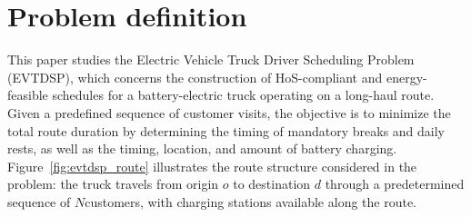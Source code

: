 \documentclass[3p,11pt,authoryear]{elsarticle}  %
\begin{document}
    \section{Problem definition}
    
    
    
This paper studies the Electric Vehicle Truck Driver Scheduling Problem (EVTDSP), which concerns the construction of HoS-compliant and energy-feasible schedules for a battery-electric truck operating on a long-haul route. Given a predefined sequence of customer visits, the objective is to minimize the total route duration by determining the timing of mandatory breaks and daily rests, as well as the timing, location, and amount of battery charging. Figure~\ref{fig:evtdsp_route} illustrates the route structure considered in the problem: the truck travels from origin $o$ to destination $d$ through a predetermined sequence of $N$customers, with charging stations available along the route.
\end{document}
